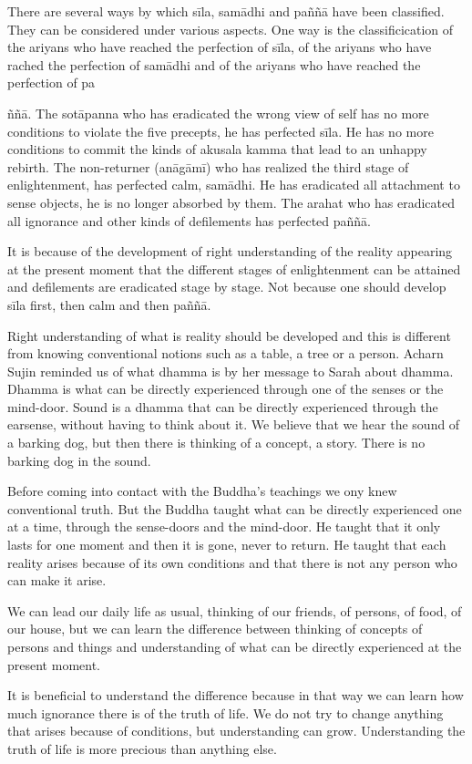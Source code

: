 There are several ways by which sīla, samādhi and paññā have
been classified. They can be considered under various aspects. One way
is the classificication of the ariyans who have reached the perfection
of sīla, of the ariyans who have rached the perfection of
samādhi and of the ariyans who have reached the perfection of pa{ññā.
The sotāpanna who has eradicated the wrong view of self has
no more conditions to violate the five precepts, he has perfected sīla.
He has no more conditions to commit the kinds of akusala kamma that lead
to an unhappy rebirth. The non-returner (anāgāmī) who has realized the
third stage of enlightenment, has perfected calm, samādhi. He has
eradicated all attachment to sense objects, he is no longer absorbed by
them. The arahat who has eradicated all ignorance and other kinds of
defilements has perfected paññā. 

It is because of the development of right understanding of
the reality appearing at the present moment that the different stages of
enlightenment can be attained and defilements are eradicated stage by
stage. Not because one should develop sīla first, then calm and then
paññā. 

Right understanding of what is reality should be developed
and this is different from knowing conventional notions such as a table,
a tree or a person. Acharn Sujin reminded us of what dhamma is by her
message to Sarah about dhamma. Dhamma is what can be directly
experienced through one of the senses or the mind-door. Sound is a
dhamma that can be directly experienced through the earsense, without
having to think about it. We believe that we hear the sound of a barking
dog, but then there is thinking of a concept, a story. There is no
barking dog in the sound.

Before coming into contact with the Buddha's teachings we ony
knew conventional truth. But the Buddha taught what can be directly
experienced one at a time, through the sense-doors and the mind-door. He
taught that it only lasts for one moment and then it is gone, never to
return. He taught that each reality arises because of its own conditions
and that there is not any person who can make it arise. 

We can lead our daily life as usual, thinking of our friends,
of persons, of food, of our house, but we can learn the difference
between thinking of concepts of persons and things and understanding of
what can be directly experienced at the present moment. 

It is beneficial to understand the difference because in that
way we can learn how much ignorance there is of the truth of life. We do
not try to change anything that arises because of conditions, but
understanding can grow. Understanding the truth of life is more precious
than anything else. 




}
